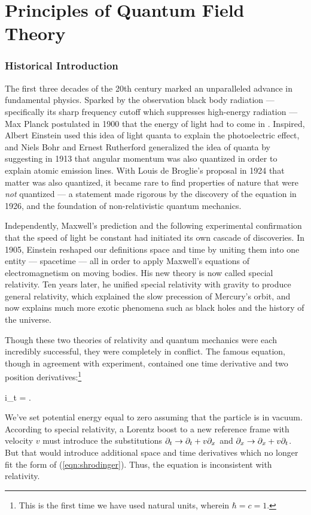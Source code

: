 \chapter{Principles of Quantum Field Theory}
\label{chap:intro}

\subsection{Historical Introduction}

The first three decades of the 20th century marked an unparalleled advance in fundamental physics. Sparked by the observation black body radiation --- specifically its sharp frequency cutoff which suppresses high-energy radiation --- Max Planck postulated in 1900 that the energy of light had to come in . Inspired, Albert Einstein used this idea of light quanta to explain the photoelectric effect, and Niels Bohr and Ernest Rutherford generalized the idea of quanta by suggesting in 1913 that angular momentum was also quantized in order to explain atomic emission lines. With Louis de Broglie's proposal in 1924 that matter was also quantized, it became rare to find properties of nature that were \textit{not} quantized --- a statement made rigorous by the discovery of the \Schrodinger equation in 1926, and the foundation of non-relativistic quantum mechanics.

Independently, Maxwell's prediction and the following experimental confirmation that the speed of light be constant had initiated its own cascade of discoveries. In 1905, Einstein reshaped our definitions space and time by uniting them into one entity --- spacetime --- all in order to apply Maxwell's equations of electromagnetism on moving bodies. His new theory is now called special relativity. Ten years later, he unified special relativity with gravity to produce general relativity, which explained the slow precession of Mercury's orbit, and now explains much more exotic phenomena such as black holes and the history of the universe.

Though these two theories of relativity and quantum mechanics were each incredibly successful, they were completely in conflict. The famous \Schrodinger equation, though in agreement with experiment, contained one time derivative and two position derivatives:\footnote{This is the first time we have used natural units, wherein $\hbar = c = 1$.}
\begin{e}
  i\partial_t \psi = \psi.
  \label{eqn:shrodinger}
\end{e}
We've set potential energy equal to zero assuming that the particle is in vacuum. According to special relativity, a Lorentz boost to a new reference frame with velocity $v$ must introduce the substitutions $\partial_t \rightarrow \partial_t + v \partial_x$ and $\partial_x \rightarrow \partial_x + v \partial_t$. But that would introduce additional space and time derivatives which no longer fit the form of (\ref{eqn:shrodinger}). Thus, the \Schrodinger equation is inconsistent with relativity.

